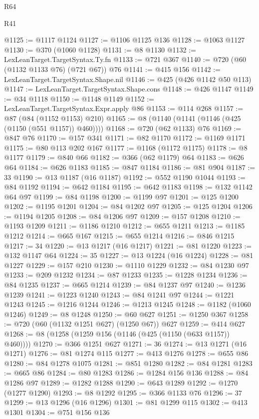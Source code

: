 \begin{lexlean}{R64}
\begin{lexlean}{R41}
\begin{coremodule}
{{{{{{{{{{{{{{{{{{{{{{{{{{{{{{{{{{{{{{{{{{{{{{{{{{{{{{{{{{{{{{{{{{{{{{{{{{{{{{{{{{{{{{{{{@1125 := @1117 @1124
@1127 := @1106 @1125 @136
@1128 := @1063 @1127
@1130 := @370 (@1060 @1128)
@1131 := @8 @1130
@1132 := LexLeanTarget.TargetSyntax.Ty.fn
@1133 := @721 @367
@1140 := @720 (@60 (@1132 @1133 @76) (@721 @67)) @76
@1141 := @415 @156
@1142 := LexLeanTarget.TargetSyntax.Shape.nil
@1146 := @425 (@426 @1142 @50 @113)
@1147 := LexLeanTarget.TargetSyntax.Shape.cons
@1148 := @426 @1147
@1149 := @34 @1118
@1150 := @1148 @1149
@1152 := LexLeanTarget.TargetSyntax.Expr.apply @86
@1153 := @114 @268
@1157 := @87 (@84 (@1152 @1153) @210)
@1165 := @8 (@1140 (@1141 (@1146 (@425 (@1150 (@551 @1157)) @460))))
@1168 := @720 (@62 @1133) @76
@1169 := @847 @76
@1170 := @157 @341
@1171 := @82 @1170
@1172 := @1169 @1171
@1175 := @80 @113 @202 @167
@1177 := @1168 (@1172 @1175)
@1178 := @8 @1177
@1179 := @840 @66
@1182 := @366 (@62 @1179) @64
@1183 := @626 @64
@1184 := @626 @1183
@1185 := @847 @1184
@1186 := @81 @904
@1187 := 33
@1190 := @13 @1187 (@16 @1187)
@1192 := @552 @1190 @1044
@1193 := @84 @1192
@1194 := @642 @1184
@1195 := @642 @1183
@1198 := @132 @1142 @64 @97
@1199 := @84 @1198
@1200 := @1199 @97
@1201 := @125 @1200
@1202 := @1195 @1201
@1204 := @84 @1202 @97
@1205 := @125 @1204
@1206 := @1194 @1205
@1208 := @84 @1206 @97
@1209 := @157 @1208
@1210 := @1193 @1209
@1211 := @1186 @1210
@1212 := @655 @1211
@1213 := @1185 @1212
@1214 := @665 @167
@1215 := @655 @1214
@1216 := @846 @1215
@1217 := 34
@1220 := @13 @1217 (@16 @1217)
@1221 := @81 @1220
@1223 := @132 @1147 @64
@1224 := 35
@1227 := @13 @1224 (@16 @1224)
@1228 := @81 @1227
@1229 := @157 @210
@1230 := @1110 @1229
@1232 := @84 @1230 @97
@1233 := @209 @1232
@1234 := @87 @1233
@1235 := @1228 @1234
@1236 := @84 @1235
@1237 := @665 @1214
@1239 := @84 @1237 @97
@1240 := @1236 @1239
@1241 := @1223 @1240
@1243 := @84 @1241 @97
@1244 := @1221 @1243
@1245 := @1216 @1244
@1246 := @1213 @1245
@1248 := @1182 (@1060 @1246)
@1249 := @8 @1248
@1250 := @60 @627
@1251 := @1250 @367
@1258 := @720 (@60 (@1132 @1251 @627) (@1250 @67)) @627
@1259 := @414 @627
@1268 := @8 (@1258 (@1259 @156 (@1146 (@425 (@1150 (@633 @1157)) @460))))
@1270 := @366 @1251 @627
@1271 := 36
@1274 := @13 @1271 (@16 @1271)
@1276 := @81 @1274 @115
@1277 := @413 @1276
@1278 := @655 @86
@1280 := @84 @1278 @1075
@1281 := @851 @1280
@1282 := @84 @1281
@1283 := @665 @86
@1284 := @80 @1283
@1286 := @1284 @156 @136
@1288 := @84 @1286 @97
@1289 := @1282 @1288
@1290 := @643 @1289
@1292 := @1270 (@1277 @1290)
@1293 := @8 @1292
@1295 := @366 @1133 @76
@1296 := 37
@1299 := @13 @1296 (@16 @1296)
@1301 := @81 @1299 @115
@1302 := @413 @1301
@1304 := @751 @156 @136
}}}}}}}}}}}}}}}}}}}}}}}}}}}}}}}}}}}}}}}}}}}}}}}}}}}}}}}}}}}}}}}}}}}}}}}}}}}}}}}}}}}}}}}}}
\end{coremodule}
\end{lexlean}
\end{lexlean}

